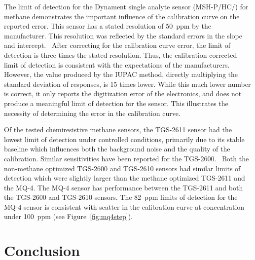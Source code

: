 \documentclass[times]{joehreview}
\begin{document}
	The limit of detection for the Dynament single analyte sensor (MSH-P/HC/) for methane demonstrates the important influence of the calibration curve on the reported error.  This sensor has a stated resolution of 50~ppm by the manufacturer.  This resolution was reflected by the standard errors in the slope and intercept.~\cite{long_limit_1983}   After correcting for the calibration curve error, the limit of detection is three times the stated resolution.  Thus, the calibration corrected limit of detection is consistent with the expectations of the manufacturers.  However, the value produced by the IUPAC method, directly multiplying the standard deviation of responses, is 15 times lower.  While this much lower number is correct, it only reports the digitization error of the electronics, and does not produce a meaningful limit of detection for the sensor.  This illustrates the necessity of determining the error in the calibration curve.
	
	Of the tested chemiresistive methane sensors, the TGS-2611 sensor had the lowest limit of detection under controlled conditions, primarily due to its stable baseline which influences both the background noise and the quality of the calibration.  Similar sensitivities have been reported for the TGS-2600.~\cite{eugster_performance_2012}  Both the non-methane optimized TGS-2600 and TGS-2610 sensors had similar limits of detection which were slightly larger than the methane optimized TGS-2611 and the MQ-4.  The MQ-4 sensor has performance between the TGS-2611 and both the TGS-2600 and TGS-2610 sensors.  The 82~ppm limits of detection for the MQ-4 sensor is consistent with scatter in the calibration curve at concentration under 100~ppm (see Figure~\ref{fig:mq4step}).
	
	\FloatBarrier	
	
	\section*{Conclusion}
	
\end{document}
